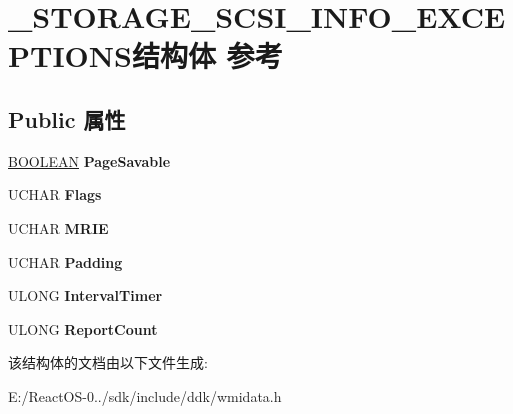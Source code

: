 \hypertarget{struct___s_t_o_r_a_g_e___s_c_s_i___i_n_f_o___e_x_c_e_p_t_i_o_n_s}{}\section{\+\_\+\+S\+T\+O\+R\+A\+G\+E\+\_\+\+S\+C\+S\+I\+\_\+\+I\+N\+F\+O\+\_\+\+E\+X\+C\+E\+P\+T\+I\+O\+N\+S结构体 参考}
\label{struct___s_t_o_r_a_g_e___s_c_s_i___i_n_f_o___e_x_c_e_p_t_i_o_n_s}
\subsection*{Public 属性}
\begin{DoxyCompactItemize}
\item 
\mbox{\label{struct___s_t_o_r_a_g_e___s_c_s_i___i_n_f_o___e_x_c_e_p_t_i_o_n_s_a6a29dd9043d7725604ff58fd7c0805b3}} 
\hyperlink{_processor_bind_8h_a112e3146cb38b6ee95e64d85842e380a}{B\+O\+O\+L\+E\+AN} {\bfseries Page\+Savable}
\item 
\mbox{\label{struct___s_t_o_r_a_g_e___s_c_s_i___i_n_f_o___e_x_c_e_p_t_i_o_n_s_a4fb4827568d37680cd61b86d204f6cb1}} 
U\+C\+H\+AR {\bfseries Flags}
\item 
\mbox{\label{struct___s_t_o_r_a_g_e___s_c_s_i___i_n_f_o___e_x_c_e_p_t_i_o_n_s_ad75b59f616ec2ba4efd8578aafca11d7}} 
U\+C\+H\+AR {\bfseries M\+R\+IE}
\item 
\mbox{\label{struct___s_t_o_r_a_g_e___s_c_s_i___i_n_f_o___e_x_c_e_p_t_i_o_n_s_a86a9e4bf1d81f87dabce7a9dbf201675}} 
U\+C\+H\+AR {\bfseries Padding}
\item 
\mbox{\label{struct___s_t_o_r_a_g_e___s_c_s_i___i_n_f_o___e_x_c_e_p_t_i_o_n_s_a1e973f564ae0140432356f56072ea0ae}} 
U\+L\+O\+NG {\bfseries Interval\+Timer}
\item 
\mbox{\label{struct___s_t_o_r_a_g_e___s_c_s_i___i_n_f_o___e_x_c_e_p_t_i_o_n_s_ae8ffdf26b8609a71d65d380f25c94fac}} 
U\+L\+O\+NG {\bfseries Report\+Count}
\end{DoxyCompactItemize}


该结构体的文档由以下文件生成\+:\begin{DoxyCompactItemize}
\item 
E\+:/\+React\+O\+S-\/0../sdk/include/ddk/wmidata.\+h\end{DoxyCompactItemize}
